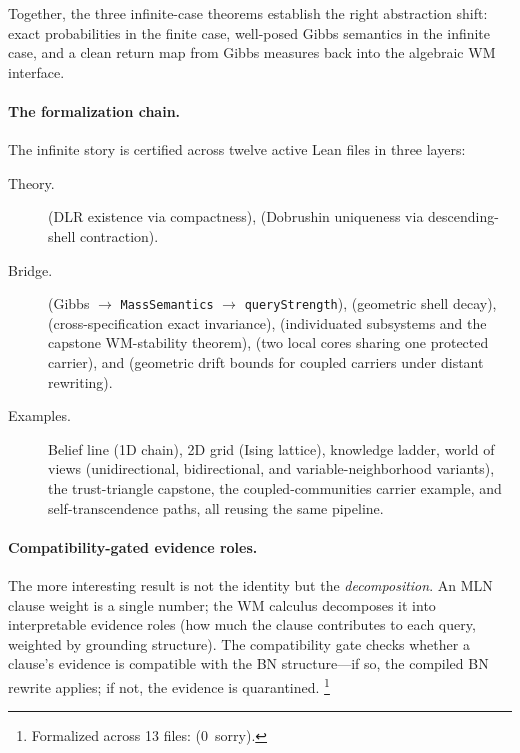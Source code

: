 \documentclass[11pt,openany]{report}
\begin{document}
\noindent
Together, the three infinite-case theorems establish the right abstraction
shift: exact probabilities in the finite case, well-posed Gibbs semantics in
the infinite case, and a clean return map from Gibbs measures back into the
algebraic WM interface.

\paragraph{The formalization chain.}
The infinite story is certified across twelve active Lean files in three
layers:
\begin{description}
\item[Theory.]   (DLR existence
  via compactness),  (Dobrushin
  uniqueness via descending-shell contraction).
\item[Bridge.]   (Gibbs
  $\to$ \texttt{MassSemantics} $\to$ \texttt{queryStrength}),
   (geometric shell
  decay),  (cross-specification
  exact invariance),  (individuated
  subsystems and the capstone WM-stability theorem),
   (two local cores sharing one
  protected carrier), and 
  (geometric drift bounds for coupled carriers under distant rewriting).
\item[Examples.]  Belief line (1D chain), 2D grid (Ising lattice),
  knowledge ladder, world of views (unidirectional, bidirectional, and
  variable-neighborhood variants), the trust-triangle capstone, the
  coupled-communities carrier example, and self-transcendence paths, all
  reusing the same pipeline.
\end{description}

\paragraph{Compatibility-gated evidence roles.}
The more interesting result is not the identity but the
\emph{decomposition}.  An MLN clause weight is a single number;
the WM calculus decomposes it into interpretable evidence roles
(how much the clause contributes to each query, weighted by
grounding structure).  The compatibility gate checks whether a
clause's evidence is compatible with the BN structure---if so,
the compiled BN rewrite applies; if not, the evidence is
quarantined.%
\footnote{Formalized across 13 files:
(0~sorry).}
\end{document}
